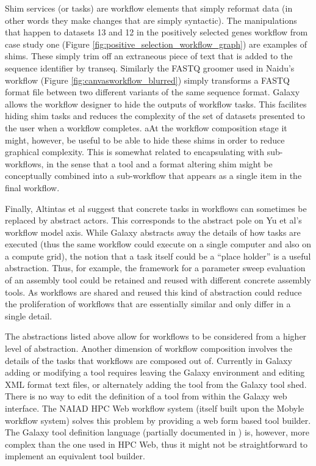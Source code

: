 \documentclass[a4paper,10pt]{scrreprt} \usepackage[utf8]{inputenc}
\begin{document}
Shim services (or tasks) are workflow elements that simply reformat data (in other words they make changes that are simply syntactic). The manipulations that happen to datasets 13 and 12 in the positively selected genes workflow from case study one (Figure \ref{fig:positive_selection_workflow_graph}) are examples of shims. These simply trim off an extraneous piece of text that is added to the sequence identifier by transeq. Similarly the FASTQ groomer used in Naidu's workflow (Figure \ref{fig:canvasworkflow_blurred}) simply transforms a FASTQ format file between two different variants of the same sequence format. Galaxy allows the workflow designer to hide the outputs of workflow tasks. This facilites hiding shim tasks and reduces the complexity of the set of datasets presented to the user when a workflow completes. aAt the workflow composition stage it might, however, be useful to be able to hide these shims in order to reduce graphical complexity. This is somewhat related to encapsulating with sub-
workflows, in the sense that a tool and a format altering shim might be conceptually combined into a sub-workflow that appears as a single item in the final workflow.

Finally, Altintas et al suggest that concrete tasks in workflows can sometimes be replaced by abstract actors. This corresponds to the abstract pole on Yu et al's workflow model axis. While Galaxy abstracts away the details of how tasks are executed (thus the same workflow could execute on a single computer and also on a compute grid), the notion that a task itself could be a ``place holder'' is a useful abstraction. Thus, for example, the framework for a parameter sweep evaluation of an assembly tool could be retained and reused with different concrete assembly tools. As workflows are shared and reused this kind of abstraction could reduce the proliferation of workflows that are essentially similar and only differ in a single detail.

The abstractions listed above allow for workflows to be considered from a higher level of abstraction. Another dimension of workflow composition involves the details of the tasks that workflows are composed out of. Currently in Galaxy adding or modifying a tool requires leaving the Galaxy environment and editing XML format text files, or alternately adding the tool from the Galaxy tool shed. There is no way to edit the definition of a tool from within the Galaxy web interface. The NAIAD HPC Web workflow system \cite{tartakovsky_cyber_2011} (itself built upon the Mobyle \cite{neron_mobyle:_2009} workflow system) solves this problem by providing a web form based tool builder. The Galaxy tool definition language (partially documented in \cite{the_galaxy_team_galaxy_2011}) is, however, more complex than the one used in HPC Web, thus it might not be straightforward to implement an equivalent tool builder.
\end{document}
